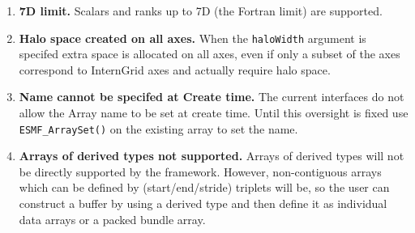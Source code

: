 

\begin{enumerate}

\item {\bf 7D limit.}  Scalars and ranks up to 7D (the Fortran limit) are 
supported.

\item {\bf Halo space created on all axes.}
When the {\tt haloWidth} argument is specifed extra space is allocated
on all axes, even if only a subset of the axes correspond to InternGrid axes 
and actually require halo space.

\item {\bf Name cannot be specifed at Create time.}
The current interfaces do not allow the Array name to be set at
create time. Until this oversight is fixed use 
{\tt ESMF\_ArraySet()} on the existing array to set the name.

\item {\bf Arrays of derived types not supported.}  Arrays of derived 
types will not be directly supported by the framework.
However, non-contiguous arrays which can be defined by (start/end/stride)
triplets will be, so the user can construct a buffer by using a derived
type and then define it as individual data arrays or a packed bundle array.

\end{enumerate}
